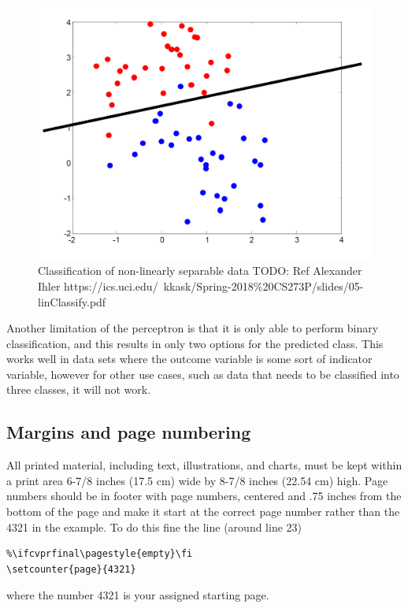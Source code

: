 \documentclass[10pt,twocolumn,a4paper]{article}
\begin{document}
\begin{figure}
    \centering
    \includegraphics[width=1\linewidth]{non-linearly-separable2.png}
    \caption{Classification of non-linearly separable data TODO: Ref Alexander Ihler https://ics.uci.edu/~kkask/Spring-2018\%20CS273P/slides/05-linClassify.pdf }
    \label{fig:non-linearly-separable-2}
\end{figure}

Another limitation of the perceptron is that it is only able to perform binary classification, and this results in only two options for the predicted class. This works well in data sets where the outcome variable is some sort of indicator variable, however for other use cases, such as data that needs to be classified into three classes, it will not work.


\subsection{Margins and page numbering}

All printed material, including text, illustrations, and charts, must be kept
within a print area 6-7/8 inches (17.5 cm) wide by 8-7/8 inches (22.54 cm)
high.
Page numbers should be in footer with page numbers, centered and .75
inches from the bottom of the page and make it start at the correct page
number rather than the 4321 in the example.  To do this fine the line (around
line 23)
\begin{verbatim}
%\ifcvprfinal\pagestyle{empty}\fi
\setcounter{page}{4321}
\end{verbatim}
where the number 4321 is your assigned starting page.
\end{document}

